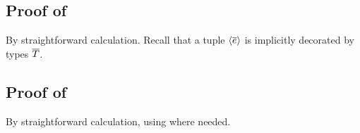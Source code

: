 \subsection*{Proof of }

By straightforward calculation. Recall that a tuple $\langle\overline{e}\rangle$ is
implicitly decorated by types $\overline{T}$.



\subsection*{Proof of }

By straightforward calculation, using  where needed.







